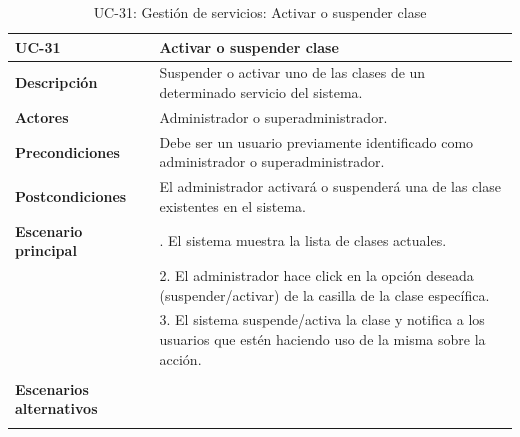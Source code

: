 \begin{table}
  \begin{center}
    \begin{tabularx}{16.4cm}{|l|X|}
      \hline
      \textbf{UC-31} & \textbf{Activar o suspender clase}\\
      \hline
      \textbf{Descripción} & Suspender o activar uno de las clases de un determinado servicio del sistema.\\
      \hline
      \textbf{Actores} & Administrador o superadministrador.\\
      \hline
      \textbf{Precondiciones} & Debe ser un usuario previamente identificado como administrador o superadministrador.\\
      \hline
      \textbf{Postcondiciones} & El administrador activará o suspenderá una de las clase existentes en el sistema.\\
      \hline
      \textbf{Escenario principal} & \smallskip 1. El sistema muestra la lista de clases actuales.\\
      & 2. El administrador hace click en la opción deseada (suspender/activar) de la casilla de la clase específica.\\
      & 3. El sistema suspende/activa la clase y notifica a los usuarios que estén haciendo uso de la misma sobre la acción.\\
      & \\
      \hline
      \textbf{Escenarios alternativos} & \smallskip \\
      & \\
      \hline
    \end{tabularx}
    \caption{UC-31: Gestión de servicios: Activar o suspender clase}
    \label{tab:CU-activar-suspender-clase}
  \end{center}
\end{table}


